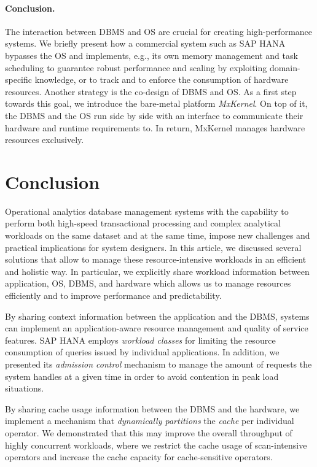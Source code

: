 \documentclass[11pt]{article}
\begin{document}
\paragraph*{Conclusion.}
The interaction between DBMS and OS are crucial for creating high-performance systems.
We briefly present how a commercial system such as SAP HANA bypasses the OS and implements, e.g., its own memory management and task scheduling to guarantee robust performance and scaling by exploiting domain-specific knowledge, or to track and to enforce the consumption of hardware resources.
Another strategy is the co-design of DBMS and OS.
As a first step towards this goal, we introduce the bare-metal platform \emph{MxKernel}.
On top of it, the DBMS and the OS run side by side with an interface to communicate their hardware and runtime requirements to.
In return, MxKernel manages hardware resources exclusively.



\section{Conclusion}
\label{nollhrm19:sec:conclusion}

Operational analytics database management systems with the capability to perform both high-speed transactional processing and complex analytical workloads on the same dataset and at the same time, impose new challenges and practical implications for system designers.
In this article, we discussed several solutions that allow to manage these resource-intensive workloads in an efficient and holistic way.
In particular, we explicitly share workload information between application, OS, DBMS, and hardware which allows us to manage resources efficiently and to improve performance and predictability.

By sharing context information between the application and the DBMS, systems can implement an application-aware resource management and quality of service features.
SAP HANA employs \emph{workload classes} for limiting the resource consumption of queries issued by individual applications.
In addition, we presented its \emph{admission control} mechanism to manage the amount of requests the system handles at a given time in order to avoid contention in peak load situations.

By sharing cache usage information between the DBMS and the hardware, we implement a mechanism that \emph{dynamically partitions} the \emph{cache} per individual operator.
We demonstrated that this may improve the overall throughput of highly concurrent workloads, where we restrict the cache usage of scan-intensive operators and increase the cache capacity for cache-sensitive operators.
\end{document}
